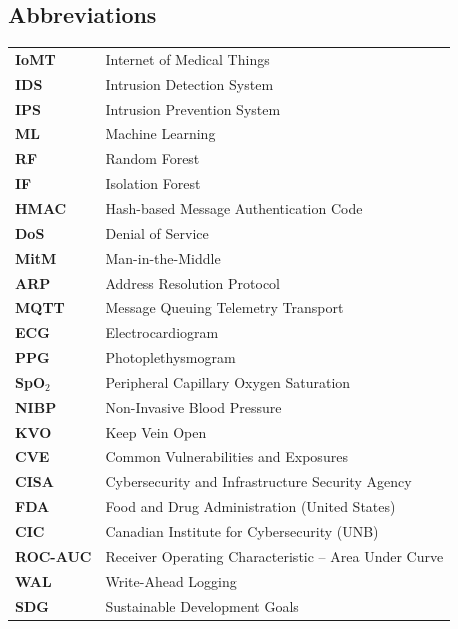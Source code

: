 \documentclass[12pt,a4paper]{report}
\begin{document}
\subsection*{Abbreviations}
\begin{tabular}{ll}
    \textbf{IoMT} & Internet of Medical Things \\
    \textbf{IDS} & Intrusion Detection System \\
    \textbf{IPS} & Intrusion Prevention System \\
    \textbf{ML} & Machine Learning \\
    \textbf{RF} & Random Forest \\
    \textbf{IF} & Isolation Forest \\
    \textbf{HMAC} & Hash-based Message Authentication Code \\
    \textbf{DoS} & Denial of Service \\
    \textbf{MitM} & Man-in-the-Middle \\
    \textbf{ARP} & Address Resolution Protocol \\
    \textbf{MQTT} & Message Queuing Telemetry Transport \\
    \textbf{ECG} & Electrocardiogram \\
    \textbf{PPG} & Photoplethysmogram \\
    \textbf{SpO}$_2$ & Peripheral Capillary Oxygen Saturation \\
    \textbf{NIBP} & Non-Invasive Blood Pressure \\
    \textbf{KVO} & Keep Vein Open \\
    \textbf{CVE} & Common Vulnerabilities and Exposures \\
    \textbf{CISA} & Cybersecurity and Infrastructure Security Agency \\
    \textbf{FDA} & Food and Drug Administration (United States) \\
    \textbf{CIC} & Canadian Institute for Cybersecurity (UNB) \\
    \textbf{ROC-AUC} & Receiver Operating Characteristic -- Area Under Curve \\
    \textbf{WAL} & Write-Ahead Logging \\
    \textbf{SDG} & Sustainable Development Goals \\
\end{tabular}

\vspace{0.8cm}
\end{document}
